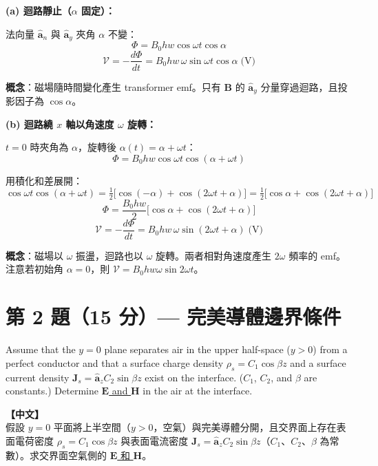 \documentclass[12pt,a4paper]{article}
\newcommand{\vE}{\mathbf{E}}
\newcommand{\vB}{\mathbf{B}}
\newcommand{\vH}{\mathbf{H}}
\newcommand{\vJ}{\mathbf{J}}
\newcommand{\ay}{\hat{\mathbf{a}}_y}
\newcommand{\az}{\hat{\mathbf{a}}_z}
\newcommand{\an}{\hat{\mathbf{a}}_n}
\newcommand{\emf}{\mathcal{V}}
\begin{document}
\begin{solutionbox}[詳解]

\textbf{(a) 迴路靜止（$\alpha$ 固定）：}

法向量 $\an$ 與 $\ay$ 夾角 $\alpha$ 不變：
\[
  \Phi = B_0 hw\cos\omega t\cos\alpha
\]
\[
  \boxed{\emf = -\frac{d\Phi}{dt} = B_0 hw\,\omega\sin\omega t\cos\alpha \;\text{(V)}}
\]

\textbf{概念}：磁場隨時間變化產生 transformer emf。只有 $\vB$ 的 $\ay$ 分量穿過迴路，且投影因子為 $\cos\alpha$。

\bigskip
\textbf{(b) 迴路繞 $x$ 軸以角速度 $\omega$ 旋轉：}

$t=0$ 時夾角為 $\alpha$，旋轉後 $\alpha(t) = \alpha + \omega t$：
\[
  \Phi = B_0 hw\cos\omega t\cos(\alpha + \omega t)
\]

用積化和差展開：
\[
  \cos\omega t\cos(\alpha+\omega t)
  = \tfrac{1}{2}\bigl[\cos(-\alpha) + \cos(2\omega t + \alpha)\bigr]
  = \tfrac{1}{2}\bigl[\cos\alpha + \cos(2\omega t + \alpha)\bigr]
\]
\[
  \Phi = \frac{B_0 hw}{2}\bigl[\cos\alpha + \cos(2\omega t + \alpha)\bigr]
\]
\[
  \boxed{\emf = -\frac{d\Phi}{dt} = B_0 hw\,\omega\sin(2\omega t + \alpha) \;\text{(V)}}
\]

\textbf{概念}：磁場以 $\omega$ 振盪，迴路也以 $\omega$ 旋轉。兩者相對角速度產生 $2\omega$ 頻率的 emf。注意若初始角 $\alpha = 0$，則 $\emf = B_0 hw\omega\sin 2\omega t$。
\end{solutionbox}

\section{第 2 題（15 分）— 完美導體邊界條件}

\begin{questionbox}
Assume that the $y = 0$ plane separates air in the upper half-space ($y > 0$) from a perfect conductor and that a surface charge density $\rho_s = C_1\cos\beta z$ and a surface current density $\vJ_s = \az C_2\sin\beta z$ exist on the interface. ($C_1$, $C_2$, and $\beta$ are constants.) Determine \underline{$\vE$ and $\vH$} in the air at the interface.

\medskip\noindent\textbf{【中文】}\\
假設 $y=0$ 平面將上半空間（$y>0$，空氣）與完美導體分開，且交界面上存在表面電荷密度 $\rho_s = C_1\cos\beta z$ 與表面電流密度 $\vJ_s = \az C_2\sin\beta z$（$C_1$、$C_2$、$\beta$ 為常數）。求交界面空氣側的 \underline{$\vE$ 和 $\vH$}。
\end{questionbox}
\end{document}
